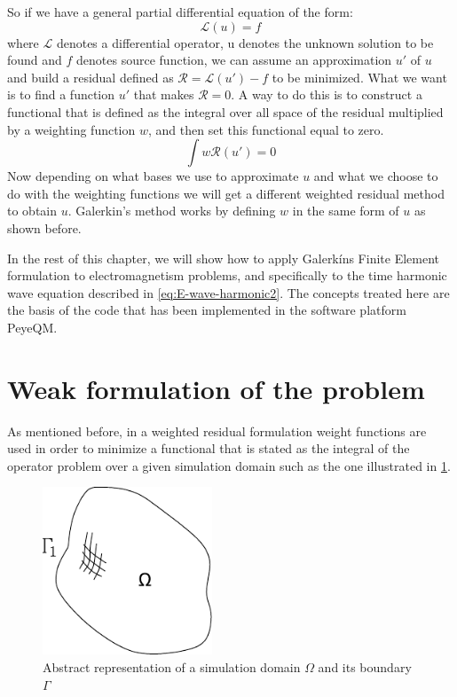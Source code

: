 So if we have a general partial differential equation of the form: 
\begin{equation}
\mathcal{L}(u) = f
\label{eq:general_form_of_DE}
\end{equation}  where $\mathcal{L}$ denotes a differential operator, u denotes the unknown solution to be found and $f$ denotes source function, we can assume an approximation $u'$ of $u$ and build a residual defined as $\mathcal{R} = \mathcal{L}(u')-f$ to be minimized. What we want is to find a function $u'$ that makes $\mathcal{R}=0$. A way to do this is to construct a functional that is defined as the integral over all space of the residual multiplied by a weighting function $w$, and then set this functional equal to zero. 
\begin{equation}
\int w \mathcal{R}(u') = 0
\end{equation}
Now depending on what bases we use to approximate $u$ and what we choose to do with the weighting functions we will get a different weighted residual method to obtain $u$. 
Galerkin's method works by defining $w$ in the same form of $u$ as shown before.

In the rest of this chapter, we will show how to apply Galerkíns Finite Element formulation to electromagnetism problems, and specifically to the time harmonic wave equation described in \ref{eq:E-wave-harmonic2}. The concepts treated here are the basis of the code that has been implemented in the software platform PeyeQM.

\section{Weak formulation of the problem}

As mentioned before, in a weighted residual formulation weight functions  are used in order to minimize a functional that is stated as the integral of the operator problem over a given  simulation domain such as the one illustrated in \ref{fig:domain}. 

\begin{figure}[h]
\centering
\includegraphics[height=5cm]{./img/dominio.pdf}
\caption{Abstract representation of a simulation domain $\Omega$ and its boundary $\Gamma$}
\label{fig:domain}
\end{figure}

